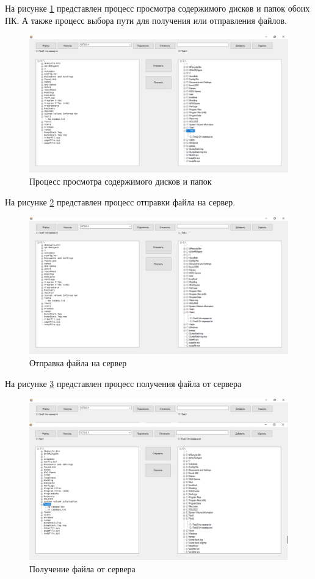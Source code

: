 На рисунке \ref{9:image} представлен процесс просмотра содержимого дисков и папок обоих ПК. А также процесс выбора пути для получения или отправления файлов.

\begin{figure}
	\centering
	\includegraphics[width=1\linewidth]{"images/9"}
	\caption{Процесс просмотра содержимого дисков и папок}
	\label{9:image}
\end{figure}

На рисунке \ref{10:image} представлен процесс отправки файла на сервер.

\begin{figure}
	\centering
	\includegraphics[width=1\linewidth]{"images/10"}
	\caption{Отправка файла на сервер}
	\label{10:image}
\end{figure}

На рисунке \ref{11:image} представлен процесс получения файла от сервера

\begin{figure}
	\centering
	\includegraphics[width=1\linewidth]{"images/11"}
	\caption{Получение файла от сервера}
	\label{11:image}
\end{figure}

